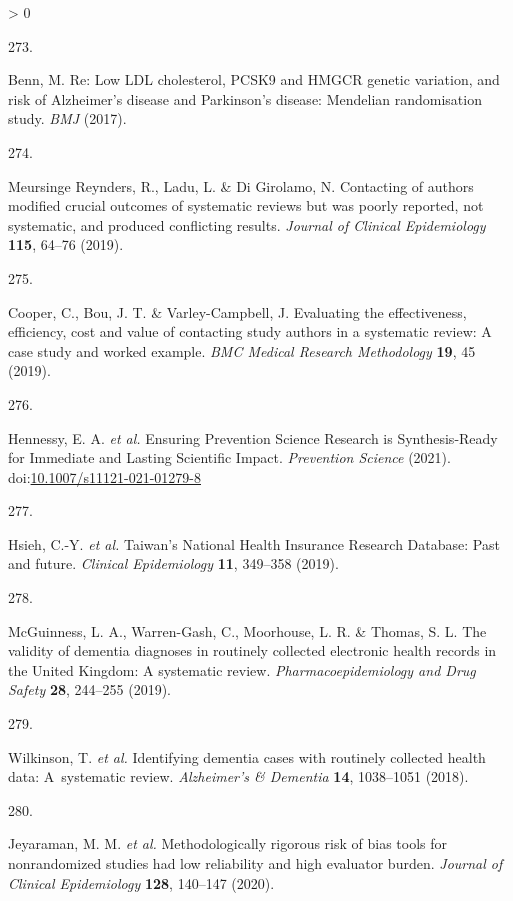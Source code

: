 \documentclass[a4paper, twoside]{templates/ociamthesis}
\newlength{\cslhangindent}
\newlength{\csllabelwidth}
\newenvironment{CSLReferences}[3] %
 {%
  \setlength{\parindent}{0pt}
  \ifodd #1 \everypar{\setlength{\hangindent}{\cslhangindent}}\ignorespaces\fi
  \ifnum #2 > 0
  \setlength{\parskip}{#2\baselineskip}
  \fi
 }%
 {}
\newcommand{\CSLLeftMargin}[1]{\parbox[t]{\maxof{\widthof{#1}}{\csllabelwidth}}{#1}}
\newcommand{\CSLRightInline}[1]{\parbox[t]{\linewidth - \csllabelwidth}{#1}}
\begin{document}
\begin{CSLReferences}{0}{0}
\leavevmode\hypertarget{ref-benn2017comment}{}%
\CSLLeftMargin{273. }
\CSLRightInline{Benn, M. Re: Low {LDL} cholesterol, {PCSK9} and {HMGCR} genetic variation, and risk of {Alzheimer}'s disease and {Parkinson}'s disease: Mendelian randomisation study. \emph{BMJ} (2017).}

\leavevmode\hypertarget{ref-meursingereynders2019}{}%
\CSLLeftMargin{274. }
\CSLRightInline{Meursinge Reynders, R., Ladu, L. \& Di Girolamo, N. Contacting of authors modified crucial outcomes of systematic reviews but was poorly reported, not systematic, and produced conflicting results. \emph{Journal of Clinical Epidemiology} \textbf{115}, 64--76 (2019).}

\leavevmode\hypertarget{ref-cooper2019}{}%
\CSLLeftMargin{275. }
\CSLRightInline{Cooper, C., Bou, J. T. \& Varley-Campbell, J. Evaluating the effectiveness, efficiency, cost and value of contacting study authors in a systematic review: A case study and worked example. \emph{BMC Medical Research Methodology} \textbf{19}, 45 (2019).}

\leavevmode\hypertarget{ref-hennessy2021}{}%
\CSLLeftMargin{276. }
\CSLRightInline{Hennessy, E. A. \emph{et al.} Ensuring {Prevention Science Research} is {Synthesis}-{Ready} for {Immediate} and {Lasting Scientific Impact}. \emph{Prevention Science} (2021). doi:\href{https://doi.org/10.1007/s11121-021-01279-8}{10.1007/s11121-021-01279-8}}

\leavevmode\hypertarget{ref-hsieh2019}{}%
\CSLLeftMargin{277. }
\CSLRightInline{Hsieh, C.-Y. \emph{et al.} Taiwan's {National Health Insurance Research Database}: Past and future. \emph{Clinical Epidemiology} \textbf{11}, 349--358 (2019).}

\leavevmode\hypertarget{ref-mcguinness2019validity}{}%
\CSLLeftMargin{278. }
\CSLRightInline{McGuinness, L. A., Warren-Gash, C., Moorhouse, L. R. \& Thomas, S. L. The validity of dementia diagnoses in routinely collected electronic health records in the {United Kingdom}: A systematic review. \emph{Pharmacoepidemiology and Drug Safety} \textbf{28}, 244--255 (2019).}

\leavevmode\hypertarget{ref-wilkinson2018}{}%
\CSLLeftMargin{279. }
\CSLRightInline{Wilkinson, T. \emph{et al.} Identifying dementia cases with routinely collected health data: A~systematic review. \emph{Alzheimer's \& Dementia} \textbf{14}, 1038--1051 (2018).}

\leavevmode\hypertarget{ref-jeyaraman2020}{}%
\CSLLeftMargin{280. }
\CSLRightInline{Jeyaraman, M. M. \emph{et al.} Methodologically rigorous risk of bias tools for nonrandomized studies had low reliability and high evaluator burden. \emph{Journal of Clinical Epidemiology} \textbf{128}, 140--147 (2020).}


\end{CSLReferences}
\end{document}
